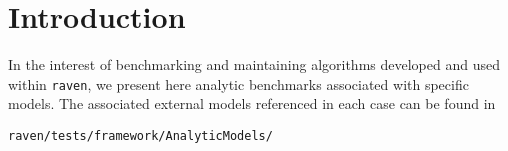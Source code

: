 \section{Introduction}
In the interest of benchmarking and maintaining algorithms developed and used within \texttt{raven}, we
present here analytic benchmarks associated with specific models. The associated external models
referenced in each case can be found in

\texttt{raven/tests/framework/AnalyticModels/}
